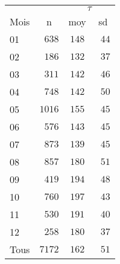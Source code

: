 \begin{tabular}{lccc}
\toprule
 &  & \multicolumn{2}{c}{$\tau$} \\ \cmidrule(lr){3-4}
Mois  & n & moy & \multicolumn{1}{c}{sd} \\ 
\midrule
01  & $\phantom{0}638$ & $148$ & $\phantom{0}44$ \\
02  & $\phantom{0}186$ & $132$ & $\phantom{0}37$ \\
03  & $\phantom{0}311$ & $142$ & $\phantom{0}46$ \\
04  & $\phantom{0}748$ & $142$ & $\phantom{0}50$ \\
05  & $1016$ & $155$ & $\phantom{0}45$ \\
06  & $\phantom{0}576$ & $143$ & $\phantom{0}45$ \\
07  & $\phantom{0}873$ & $139$ & $\phantom{0}45$ \\
08  & $\phantom{0}857$ & $180$ & $\phantom{0}51$ \\
09  & $\phantom{0}419$ & $194$ & $\phantom{0}48$ \\
10  & $\phantom{0}760$ & $197$ & $\phantom{0}43$ \\
11  & $\phantom{0}530$ & $191$ & $\phantom{0}40$ \\
12  & $\phantom{0}258$ & $180$ & $\phantom{0}37$ \\
Tous  & $7172$ & $162$ & $\phantom{0}51$ \\
\bottomrule 
\end{tabular}
